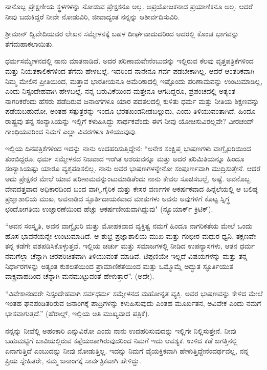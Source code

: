 ನಾನೊಬ್ಬ ಪ್ರೇಕ್ಷಣೀಯ ಸ್ಥಳಗಳನ್ನು ನೋಡುವ ಪ್ರೇಕ್ಷಕನೂ ಅಲ್ಲ. ಅಪ್ರಯೋಜಕನಾದ ಪ್ರಯಾಣಿಕನೂ ಅಲ್ಲ. ಆದರೆ ನೀವು ಬದುಕಿದ್ದರೆ ನೀವೇ ನೋಡುವಿರಿ, ಜೀವಾದ್ಯಂತ ನನ್ನನ್ನು ಆಶೀರ್ವದಿಸುವಿರಿ.

ಶ‍್ರೀಮಾನ್ ದ್ವಿವೇದಿಯವರ ಲೇಖನ ಸಮ್ಮೇಳನಕ್ಕೆ ಬಹಳ ದೀರ್ಘವಾದುದರಿಂದ ಅದರಲ್ಲಿ ಕೊಂಚ ಭಾಗವನ್ನು ತೆಗೆದುಹಾಕಲಾಯಿತು.

ಧರ್ಮಸಮ್ಮೇಳನದಲ್ಲಿ ನಾನು ಮಾತನಾಡಿದೆ. ಅದರ ಪರಿಣಾಮವೇನೆಂಬುದನ್ನು ಇಲ್ಲಿರುವ ಕೆಲವು ವೃತ್ತಪತ್ರಿಕೆಗಳಿಂದ ಮತ್ತು ನಿಯತಕಾಲಿಕಗಳಿಂದ ತೆಗೆದು ಹೇಳಬಲ್ಲೆ. ಇದರಿಂದ ನಾನೇನೂ ಗರ್ವ ಪಡಬೇಕಾಗಿಲ್ಲ. ಆದರೆ ಆಂತರಿಕವಾಗಿ ನಿಮ್ಮ ಮೇಲಿನ ಪ್ರೀತಿಯಿಂದ, ಮತ್ತಾವ ಭಾರತೀಯನೂ ಅಮೆರಿಕಾದಲ್ಲಿ ಇಷ್ಟೊಂದು ಪರಿಣಾಮವನ್ನು ಉಂಟುಮಾಡಿಲ್ಲ, ಎಂದು ನಿಸ್ಸಂದೇಹವಾಗಿ ಹೇಳಬಲ್ಲೆ. ನನ್ನ ಬರುವಿಕೆಯಿಂದ ಮತ್ತೇನೂ ಆಗದಿದ್ದರೂ, ಪ್ರಪಂಚದಲ್ಲಿ ಅತ್ಯಂತ ನಾಗರಿಕರೆಂದು ಹೆಸರು ಪಡೆದಿರುವ ಜನಾಂಗಗಳೂ ಯಾರ ಪದತಲದಲ್ಲಿ ಕುಳಿತು ಧರ್ಮ ಮತ್ತು ನೀತಿಯ ಶಿಕ್ಷಣವನ್ನು ಪಡೆಯಬಹುದೋ, ಅಂತಹ ಸತ್ಪುತ್ರರನ್ನು ಇಂದೂ ಭರತಖಂಡನೀಡಬಲ್ಲುದು, ಎಂದು ತಿಳಿಯುವಂತಾಗಿದೆ. ಹಿಂದೂ ರಾಷ್ಟ್ರವು ತನ್ನ ಸಂನ್ಯಾಸಿಯನ್ನು ಇಲ್ಲಿಗೆ ಕಳುಹಿಸಿದ್ದು ಸಾರ್ಥಕವೆಂದು ಈಗ ನೀವು ಯೋಚಿಸುವಿರಲ್ಲವೇ? ವೀರಚಂದ್ ಗಾಂಧಿಯವರಿಂದ ನಿಮಗೆ ಎಲ್ಲಾ ವಿವರಗಳೂ ತಿಳಿಯುವುವು.

ಇಲ್ಲಿಯ ದಿನಪತ್ರಿಕೆಗಳಿಂದ ಇದನ್ನು ನಾನು ಉದಹರಿಸುತ್ತಿದ್ದೇನೆ: “ಅನೇಕ ಸಂಕ್ಷಿಪ್ತ ಭಾಷಣಗಳು ವಾಗ್ವೈಖರಿಯಿಂದ ತುಂಬಿದ್ದರೂ, ಧರ್ಮ ಸಮ್ಮೇಳನದ ನಿಜವಾದ ಇಂಗಿತ ಆಶಯವನ್ನೂ ಮತ್ತು ಅದರ ಪರಿಮಿತಿಯನ್ನೂ ಹಿಂದೂ ಸಂನ್ಯಾಸಿಯಷ್ಟು ಯಾರೂ ವ್ಯಕ್ತಪಡಿಸಲಿಲ್ಲ. ನಾನು ಅವರ ಭಾಷಣಗಳನ್ನೇನೋ ಸಂಪೂರ್ಣವಾಗಿ ಮುದ್ರಿಸುತ್ತೇನೆ. ಆದರೆ ಅದು ಪ್ರೇಕ್ಷಕರ ಮೇಲೆ ಯಾವ ಪರಿಣಾಮವನ್ನುಂಟುಮಾಡಿತೆಂದು ನಾನು ಕೇವಲ ಸೂಚಿಸಬಲ್ಲೆ, ಅಷ್ಟೆ. ಅವನೊಬ್ಬ ದೇವದತ್ತವಾದ ಅಧಿಕಾರದಿಂದ ಬಂದ ವಾಗ್ಮಿ.ಗೈರಿಕ ಮತ್ತು ಕೇಸರ ವರ್ಣಗಳ ಆಕರ್ಷಕವಾದ ಹಿನ್ನೆಲೆಯಲ್ಲಿ ಆ ಬಲಿಷ್ಠ ಪ್ರಜ್ಞಾಶಾಲಿಯ ಮುಖ, ಅವನಾಡಿದ ಸ್ಫೂರ್ತಿದಾಯಕವಾದ ಮಾತುಗಳು ಅವನು ಅವುಗಳಿಗೆ ಕೊಟ್ಟ ಸ್ನಿಗ್ಧ ಛಂದೋಗತಿಯ ಉಚ್ಚಾರಣೆಯಿಂದ ಹೆಚ್ಚು ಆಕರ್ಷಣೀಯವಾಗಿದ್ದುವು" (ನ್ಯೂಯಾರ್ಕ್ ಕ್ರಿಟಿಕ್).

“ಅವನ ಸಂಸ್ಕೃತಿ, ಅವನ ವಾಗ್ವೈಖರಿ ಮತ್ತು ಮೋಹಕವಾದ ವ್ಯಕ್ತಿತ್ವ ನಮಗೆ ಹಿಂದೂ ನಾಗರಿಕತೆಯ ಮೇಲೆ ಒಂದು ಹೊಸ ಭಾವನೆಯನ್ನೇ ಉಂಟುಮಾಡಿದೆ. ಆ ಶುಭ್ರ ಪ್ರಜ್ಞಾಶಾಲಿಯ ಮುಖ ಮತ್ತು ಗಂಭೀರ ಮಧುರ ಧ್ವನಿ, ತಕ್ಷಣವೇ ತನ್ನ ಕಡೆಗೇ ವಶಪಡಿಸಿಕೊಳ್ಳುತ್ತವೆ. ಇಲ್ಲಿಯ ಚರ್ಚು ಮತ್ತು ಸಮಾಜಗಳಲ್ಲಿ ನೀಡಿದ ಉಪನ್ಯಾಸಗಳು, ಆತನ ಧರ್ಮ ನಮಗೆಲ್ಲಾ ಚೆನ್ನಾಗಿ ಚಿರಪರಿಚಿತವಾಗಿ ತಿಳಿಯುವಂತೆ ಮಾಡಿವೆ. ಟಿಪ್ಪಣಿಯೇ ಇಲ್ಲದೆ ವಿಷಯಗಳನ್ನು ಮತ್ತು ತನ್ನ ನಿರ್ಧಾರಗಳನ್ನು ಅತ್ಯಂತ ಕುಶಲತೆಯಿಂದ ಪ್ರಾಮಾಣಿಕತೆಯಿಂದ ಮತ್ತು ಒಮ್ಮೊಮ್ಮೆ ಅದ್ಭುತ ಸ್ಫೂರ್ತಿಯುತ ವಾಕ್ಪ್ರವಾಹದಿಂದ ಚೆನ್ನಾಗಿ ಮನಮುಟ್ಟುವಂತೆ ಹೇಳುತ್ತಾರೆ”. (ಅದೇ).

``ವಿವೇಕಾನಂದರೇ ನಿಸ್ಸಂದೇಹವಾಗಿ ಸರ್ವಧರ್ಮ ಸಮ್ಮೇಳನದ ಮಹೋನ್ನತ ವ್ಯಕ್ತಿ. ಅವರ ಭಾಷಣವನ್ನು ಕೇಳಿದ ಮೇಲೆ ಇಂತಹ ಘನಪಂಡಿತರಿರುವ ಜನಾಂಗಕ್ಕೆ ಪಾದ್ರಿಗಳನ್ನು ಕಳುಹಿಸುವುದು ಎಂತಹ ಮೂರ್ಖತನ, ಅವಿವೇಕ ಎಂದು ನಮಗೆ ಭಾಸವಾಗುತ್ತದೆ.” (ಹೆರಾಲ್ಡ್, ಇಲ್ಲಿಯ ಅತಿ ಮುಖ್ಯವಾದ ಪತ್ರಿಕೆ).

ನನ್ನನ್ನು ನೀವೆಲ್ಲಿ ಅಹಂಕಾರಿ ಎನ್ನುವಿರೋ ಎಂದು ನಾನು ಉದಹರಿಸುವುದನ್ನು ಇಲ್ಲಿಗೇ ನಿಲ್ಲಿಸುತ್ತೇನೆ. ನೀವು ಬಹುಮಟ್ಟಿಗೆ ಬಾವಿಯಲ್ಲಿರುವ ಕಪ್ಪೆಯಂತಾಗಿರುವುದರಿಂದ ನಿಮಗೆ ಇದು ಆವಶ್ಯಕ. ಉಳಿದ ಕಡೆ ಜಗತ್ತಿನಲ್ಲಿ ಏನಾಗುತ್ತಿದೆ ಎಂಬುದನ್ನು ನೀವು ನೋಡುತ್ತಿಲ್ಲ. ಇದನ್ನು ನಿಮಗೆ ವೈಯಕ್ತಿಕವಾಗಿ ಹೇಳುತ್ತಿದ್ದೇನೆಂದರ್ಥವಲ್ಲ, ನನ್ನ ಪ್ರಿಯ ಸ್ನೇಹಿತರೇ, ನಮ್ಮ ಜನಾಂಗಕ್ಕೆ ಸಾರ್ವತ್ರಿಕವಾಗಿ ಹೇಳಿದ್ದು.

